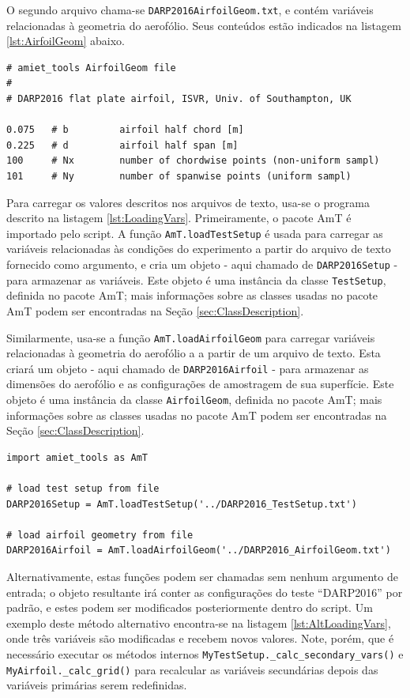 \documentclass[a4paper, 11pt, twoside]{article}
\begin{document}
O segundo arquivo chama-se \verb|DARP2016AirfoilGeom.txt|, e contém variáveis relacionadas à geometria do aerofólio. Seus conteúdos estão indicados na listagem \ref{lst:AirfoilGeom} abaixo.

\begin{lstlisting}[caption={Arquivo \texttt{DARP2016\_AirfoilGeom.txt}}, label={lst:AirfoilGeom}]
# amiet_tools AirfoilGeom file
#
# DARP2016 flat plate airfoil, ISVR, Univ. of Southampton, UK

0.075	# b			airfoil half chord [m]
0.225	# d 		airfoil half span [m]
100		# Nx 		number of chordwise points (non-uniform sampl)
101		# Ny 		number of spanwise points (uniform sampl)
\end{lstlisting}

Para carregar os valores descritos nos arquivos de texto, usa-se o programa descrito na listagem \ref{lst:LoadingVars}. Primeiramente, o pacote AmT é importado pelo script. A função \verb|AmT.loadTestSetup| é usada para carregar as variáveis relacionadas às condições do experimento a partir do arquivo de texto fornecido como argumento, e cria um objeto - aqui chamado de \verb|DARP2016Setup| - para armazenar as variáveis. Este objeto é uma instância da classe \verb|TestSetup|, definida no pacote AmT; mais informações sobre as classes usadas no pacote AmT podem ser encontradas na Seção \ref{sec:ClassDescription}.

Similarmente, usa-se a função \verb|AmT.loadAirfoilGeom| para carregar variáveis relacionadas à geometria do aerofólio a a partir de um arquivo de texto. Esta criará um objeto - aqui chamado de \verb|DARP2016Airfoil| - para armazenar as dimensões do aerofólio e as configurações de amostragem de sua superfície. Este objeto é uma instância da classe \verb|AirfoilGeom|, definida no pacote AmT; mais informações sobre as classes usadas no pacote AmT podem ser encontradas na Seção \ref{sec:ClassDescription}.

\begin{lstlisting}[caption={Importando pacotes e carregando variáveis},label={lst:LoadingVars}]
import amiet_tools as AmT

# load test setup from file
DARP2016Setup = AmT.loadTestSetup('../DARP2016_TestSetup.txt')

# load airfoil geometry from file
DARP2016Airfoil = AmT.loadAirfoilGeom('../DARP2016_AirfoilGeom.txt')
\end{lstlisting}

Alternativamente, estas funções podem ser chamadas sem nenhum argumento de entrada; o objeto resultante irá conter as configurações do teste ``DARP2016'' por padrão, e estes podem ser modificados posteriormente dentro do script. Um exemplo deste método alternativo encontra-se na listagem \ref{lst:AltLoadingVars}, onde três variáveis são modificadas e recebem novos valores. Note, porém, que é necessário executar os métodos internos \verb|MyTestSetup._calc_secondary_vars()| e \verb|MyAirfoil._calc_grid()| para recalcular as variáveis secundárias depois das variáveis primárias serem redefinidas.
\end{document}
